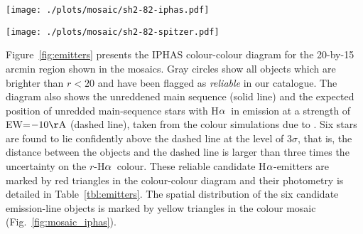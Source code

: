 \documentclass[useAMS,usenatbib]{mn2e}
\def\ha{\mbox{H$\rm \alpha$}}
\def\micron{\mbox{$\mu$m}}
\begin{document}
\begin{figure*}
    \begin{minipage}[b]{0.8\linewidth}
        \texttt{[image: ./plots/mosaic/sh2-82-iphas.pdf]} 
    \end{minipage}
\caption{IPHAS-based mosaic of H{\sc ii} region Sh 2-82,
composed of \ha\ (red channel), $r$ (green channel) and $i$ (blue channel). Yellow triangles show the position of candidate \ha-emitters
which have been selected from the colour-colour diagram
in Figure~\ref{fig:emitters}. Note that the H{\sc ii} region is surrounded by a faint blue/green reflection nebula
and dark cloud filaments.}
\label{fig:mosaic_iphas}
    \begin{minipage}[b]{0.8\linewidth}
        \texttt{[image: ./plots/mosaic/sh2-82-spitzer.pdf]} 
    \end{minipage}
    \caption{Star-forming region Sh 2-82 as seen in the mid-infrared
    by the Spitzer Space Telescope. The mosaic is composed of the 24\,\micron\ (red), 8.0\,\micron\ (green) and 4.5\,\micron\ (blue) bands.
    The image reveals a bubble-shaped structure which surrounds the {\sc Hii} region that is seen in the IPHAS mosaic of the same region (Figure~\ref{fig:mosaic_iphas}).}
    \label{fig:mosaic_spitzer}
\end{figure*}

Figure~\ref{fig:emitters} presents
the IPHAS colour-colour diagram for 
the 20-by-15 arcmin region shown in the mosaics.
Gray circles show all objects
which are brighter than $r<20$
and have been flagged as \emph{reliable}
in our catalogue.
The diagram also shows the unreddened main sequence (solid line)
and the expected position of unredded main-sequence stars
with \ha\ in emission
at a strength of EW=$-10{\rm \AA}$ (dashed line),
taken from the colour simulations due to \citet{Barentsen2011a}.
Six stars are found to lie confidently above the 
dashed line at the level of $3\sigma$,
that is, the distance between the objects and the dashed line
is larger than three times the uncertainty on the $r$-\ha\ colour.
These reliable candidate \ha-emitters
are marked by red triangles in the colour-colour diagram
and their photometry is detailed in Table~\ref{tbl:emitters}.
The spatial distribution of the six candidate emission-line objects
is marked by yellow triangles in the colour mosaic (Fig.~\ref{fig:mosaic_iphas}).
\end{document}
